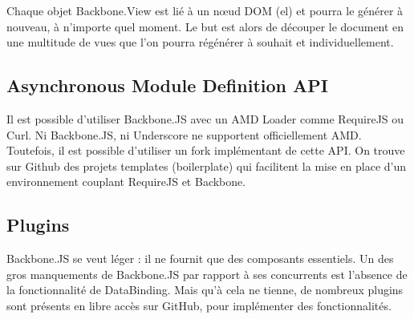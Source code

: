 Chaque objet Backbone.View est lié à un nœud DOM (el) et pourra le générer à nouveau, à n’importe quel moment. Le but est alors de découper le document en une multitude de vues que l’on pourra régénérer à souhait et individuellement. 

\subsection{Asynchronous Module Definition API}

Il est possible d’utiliser Backbone.JS avec un AMD Loader comme RequireJS ou Curl. Ni Backbone.JS, ni Underscore ne supportent officiellement AMD. Toutefois, il est possible d’utiliser un fork implémentant de cette API.
On trouve sur Github des projets templates (boilerplate) qui facilitent la mise en place d’un environnement couplant RequireJS et Backbone. 

\subsection{Plugins}

Backbone.JS se veut léger : il ne fournit que des composants essentiels. Un des gros manquements de Backbone.JS par rapport à ses concurrents est l’absence de la fonctionnalité de DataBinding. Mais qu’à cela ne tienne, de nombreux plugins sont présents en libre accès sur GitHub, pour implémenter des fonctionnalités. 
